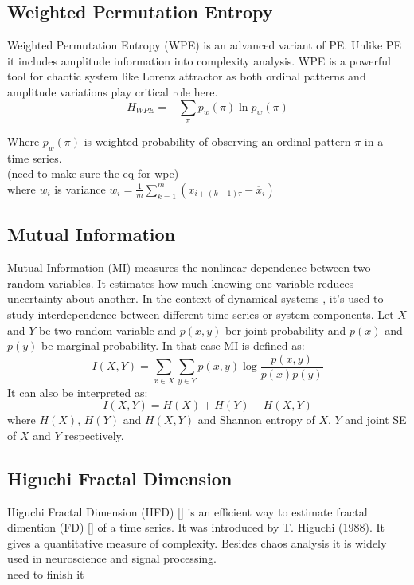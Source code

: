 \documentclass[%
reprint,
amsmath,amssymb,
aps,
floatfix,
]{revtex4-2}
\begin{document}
	\subsection{Weighted Permutation Entropy}
	Weighted Permutation Entropy (WPE) is an advanced variant of PE. Unlike PE it includes amplitude information into complexity analysis. WPE is a powerful tool for chaotic system like Lorenz attractor as both ordinal patterns and amplitude variations play critical role here.
	\begin{equation} 
		H_{WPE} = -\sum_{\pi} p_w(\pi) \ln p_w (\pi)
	\end{equation} 
	
	Where $p_w(\pi)$ is weighted probability of observing an ordinal pattern $\pi$ in a time series.\\
	(need to make sure the eq for wpe)\\
	where $w_i$ is variance $w_i = \frac{1}{m} \sum_{k=1}^{m} (x_{i+(k-1)\tau} - \overline{x}_i) $
	\subsection{Mutual Information}
	Mutual Information (MI) measures the nonlinear dependence between two random variables. It estimates how much knowing one variable reduces uncertainty about another. In the context of dynamical systems , it's used to study interdependence between different time series or system components. Let $X$ and $Y$ be two random variable and $p(x,y)$ ber joint probability and $p(x)$ and $p(y)$ be marginal probability. In that case MI is defined as:
	\begin{equation}
		I(X,Y) = \sum_{x\in X} \sum_{y\in Y} p(x,y) \log \frac{p(x,y)}{p(x)p(y)}
	\end{equation}
	It can also be interpreted as:
	\begin{equation}
		I(X,Y) = H(X) + H(Y) - H(X,Y)
	\end{equation}
	where $H(X)$, $H(Y)$ and $H(X,Y)$ and Shannon entropy of $X$, $Y$ and joint SE of $X$ and $Y$ respectively.
	\subsection{Higuchi Fractal Dimension}
	Higuchi Fractal Dimension (HFD) [] is an efficient way to estimate fractal dimention (FD) [] of a time series. It was introduced by T. Higuchi (1988). It gives a quantitative measure of complexity. Besides chaos analysis it is widely used in neuroscience and signal processing.\\
	need to finish it
\end{document}
